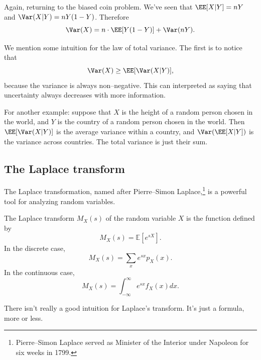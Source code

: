 \documentclass{ximera}
\begin{document}
\begin{example}
Again, returning to the biased coin problem. We've seen that $\EE[X \vert Y] = nY$ and $\Var(X \vert Y)=nY(1-Y)$. Therefore
$$
\Var(X) = n\cdot \EE[Y(1-Y)] +  \Var(nY).
$$
\end{example}

We mention some intuition for the law of total variance. The first is to notice that
$$
\Var(X) \geq \EE[\Var(X \vert Y)],
$$
because the variance is always non--negative. This can interpreted as saying that uncertainty always decreases with more information. 

For another example: suppose that $X$ is the height of a random person chosen in the world, and $Y$ is the country of a random person chosen in the world. Then $\EE[\Var(X \vert Y)]$ is the average variance within a country, and $\Var(\EE[X \vert Y])$ is the variance across countries. The total variance is just their sum.

\subsection{The Laplace transform}

The Laplace transformation, named after Pierre--Simon Laplace,\footnote{Pierre--Simon Laplace served as Minister of the Interior under Napoleon for six weeks in 1799.} is a powerful tool for analyzing random variables. 

\begin{definition}
The Laplace transform $M_X(s)$ of the random variable $X$ is the function defined by 
$$
M_X(s) = \mathbb{E}[e^{sX}].
$$
In the discrete case, 
$$
M_X(s) = \sum_x e^{sx} p_X(x).
$$
In the continuous case, 
$$
M_X(s) = \int_{-\infty}^{\infty} e^{sx} f_X(x) dx.
$$
\end{definition}

There isn't really a good intuition for Laplace's transform. It's just a formula, more or less.
\end{document}
